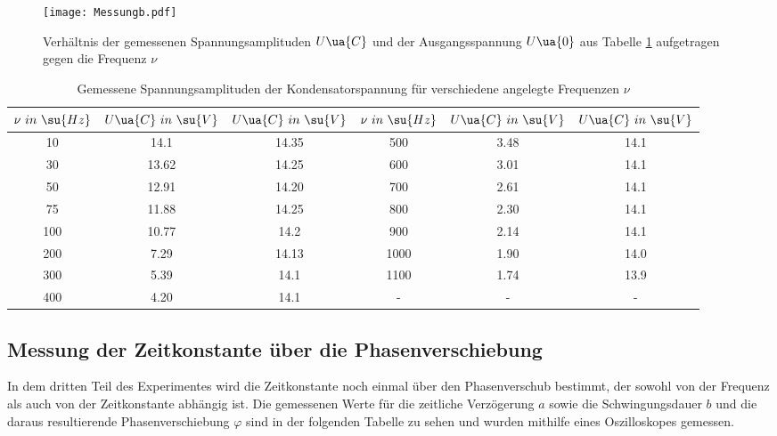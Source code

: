 \begin{figure}
  \centering
  \texttt{[image: Messungb.pdf]}
  \caption{Verhältnis der gemessenen Spannungsamplituden $U\ua{C}$ und der
           Ausgangsspannung $U\ua{0}$ aus Tabelle \ref{tab:MessungB} aufgetragen
          gegen die Frequenz $\nu$}
  \label{fig:Messungb}
\end{figure}

\begin{table}
  \centering
  \caption{Gemessene Spannungsamplituden der Kondensatorspannung für verschiedene
           angelegte Frequenzen $\nu$}
  \label{tab:MessungB}
  \begin{tabular}{ c c c || c c c }
    \toprule $\nu \,\, in \,\, \su{Hz}$ & $U\ua{C} \,\, in \,\, \su{V}$ & $U\ua{C} \,\, in \,\, \su{V}$ &
             $\nu \,\, in \,\, \su{Hz}$ & $U\ua{C} \,\, in \,\, \su{V}$ & $U\ua{C} \,\, in \,\, \su{V}$ \\
    \midrule
     10 & 14.1  & 14.35 &  500 & 3.48 & 14.1 \\
     30 & 13.62 & 14.25 &  600 & 3.01 & 14.1 \\
     50 & 12.91 & 14.20 &  700 & 2.61 & 14.1 \\
     75 & 11.88 & 14.25 &  800 & 2.30 & 14.1 \\
    100 & 10.77 & 14.2  &  900 & 2.14 & 14.1 \\
    200 &  7.29 & 14.13 & 1000 & 1.90 & 14.0 \\
    300 &  5.39 & 14.1  & 1100 & 1.74 & 13.9 \\
    400 &  4.20 & 14.1  & -    & -    & -    \\
    \bottomrule
  \end{tabular}
\end{table}

\subsection{Messung der Zeitkonstante über die Phasenverschiebung}

In dem dritten Teil des Experimentes wird die Zeitkonstante noch einmal über
den Phasenverschub bestimmt, der sowohl
von der Frequenz als auch von der Zeitkonstante abhängig ist. Die gemessenen Werte
für die zeitliche Verzögerung $a$ sowie die Schwingungsdauer $b$ und die daraus
resultierende Phasenverschiebung $\varphi$ sind in der folgenden Tabelle zu sehen
und wurden mithilfe eines Oszilloskopes gemessen.

